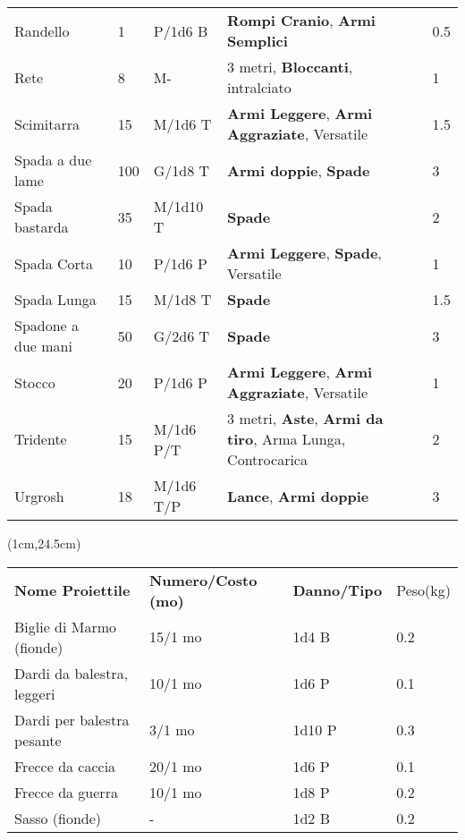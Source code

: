 \documentclass[a4paper,12 pt,openany]{book}
\begin{document}
\begin{textblock*}{19.5cm}
\begin{tabular}{lllll}
Randello& 1& P/1d6 B&\textbf{Rompi Cranio}, \textbf{Armi Semplici}& 0.5\\
Rete& 8& M-&3 metri, \textbf{Bloccanti}, intralciato& 1\\
Scimitarra& 15 & M/1d6 T&\textbf{Armi Leggere}, \textbf{Armi Aggraziate}, Versatile& 1.5\\
Spada a due lame& 100& G/1d8 T& \textbf{Armi doppie}, \textbf{Spade}& 3\\
Spada bastarda& 35 & M/1d10 T&\textbf{Spade}& 2\\
Spada Corta& 10 & P/1d6 P&\textbf{Armi Leggere}, \textbf{Spade}, Versatile& 1\\
Spada Lunga& 15 & M/1d8 T&\textbf{Spade}& 1.5\\
Spadone a due mani& 50 & G/2d6 T&\textbf{Spade}& 3\\
Stocco& 20 & P/1d6 P& \textbf{Armi Leggere}, \textbf{Armi Aggraziate}, Versatile& 1\\
Tridente& 15 & M/1d6 P/T& 3 metri, \textbf{Aste}, \textbf{Armi da tiro}, Arma Lunga, Controcarica& 2\\
Urgrosh& 18 & M/1d6 T/P& \textbf{Lance}, \textbf{Armi doppie} & 3\\
\end{tabular}


	\end{textblock*}

	\begin{textblock*}{13cm}(1cm,24.5cm) %

		\footnotesize

\begin{tabular}{llll}
\textbf{Nome Proiettile}   & \textbf{Numero/Costo (mo)} & \textbf{Danno/Tipo} & Peso(kg) \\
Biglie di Marmo (fionde)   & 15/1 mo                    & 1d4 B               & 0.2      \\
Dardi da balestra, leggeri & 10/1 mo                    & 1d6 P               & 0.1      \\
Dardi per balestra pesante & 3/1 mo                     & 1d10 P              & 0.3      \\
Frecce da caccia           & 20/1 mo                    & 1d6 P               & 0.1      \\
Frecce da guerra           & 10/1 mo                    & 1d8 P               & 0.2      \\
Sasso (fionde)             & -                          & 1d2 B               & 0.2      \\
\end{tabular}

	\end{textblock*}
\end{document}
